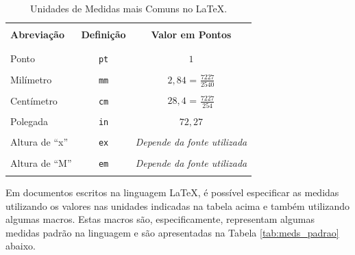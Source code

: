\begin{table}[H]
\centering
\caption{Unidades de Medidas mais Comuns no \LaTeX{}.}
\label{tab:medidas}
    \begin{tabular}{p{3cm}cc}
    \hline
    \\[-0.5em]
    \textbf{Abreviação} & \textbf{Definição} & \textbf{Valor em Pontos} \\
    \\[-0.5em]
    \hline
    \hline
    \\[-0.5em]
    Ponto           & \texttt{pt} & $1$                              \\
    \\[-0.5em]
    Milímetro       & \texttt{mm} & $2,84$ = $\frac{7227}{2540}$     \\
    \\[-0.5em]
    Centímetro      & \texttt{cm} & $28,4$ = $\frac{7227}{254}$      \\
    \\[-0.5em]
    Polegada        & \texttt{in} & $72,27$     \\
    \\[-0.5em]
    Altura de ``x'' & \texttt{ex} & \textit{Depende da fonte utilizada} \\
    \\[-0.5em]
    Altura de ``M'' & \texttt{em} & \textit{Depende da fonte utilizada} \\
    \\[-0.5em]
    \hline
    \end{tabular}
\end{table}

Em documentos escritos na linguagem \LaTeX{}, é possível especificar as medidas utilizando os valores nas unidades indicadas na tabela acima e também utilizando algumas macros. Estas macros são, especificamente, representam algumas medidas padrão na linguagem e são apresentadas na Tabela \ref{tab:meds_padrao} abaixo.

